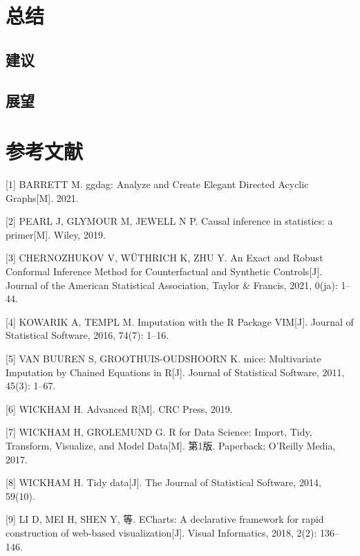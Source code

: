 \documentclass[]{ctexart}
\begin{document}
\hypertarget{ux603bux7ed3}{%
\section{总结}\label{ux603bux7ed3}}

\hypertarget{ux5efaux8bae}{%
\subsection{建议}\label{ux5efaux8bae}}

\hypertarget{ux5c55ux671b}{%
\subsection{展望}\label{ux5c55ux671b}}

\hypertarget{ux53c2ux8003ux6587ux732e}{%
\section*{参考文献}\label{ux53c2ux8003ux6587ux732e}}

\hypertarget{refs}{}
\leavevmode\hypertarget{ref-citation_ggdag}{}%
{[}1{]} BARRETT M. ggdag: Analyze and Create Elegant Directed Acyclic
Graphs{[}M{]}. 2021.

\leavevmode\hypertarget{ref-pearl}{}%
{[}2{]} PEARL J, GLYMOUR M, JEWELL N P. Causal inference in statistics:
a primer{[}M{]}. Wiley, 2019.

\leavevmode\hypertarget{ref-doi:10.1080ux2f01621459.2021.1920957}{}%
{[}3{]} CHERNOZHUKOV V, WÜTHRICH K, ZHU Y. An Exact and Robust Conformal
Inference Method for Counterfactual and Synthetic Controls{[}J{]}.
Journal of the American Statistical Association, Taylor \& Francis,
2021, 0(ja): 1--44.

\leavevmode\hypertarget{ref-citation_VIM}{}%
{[}4{]} KOWARIK A, TEMPL M. Imputation with the R Package VIM{[}J{]}.
Journal of Statistical Software, 2016, 74(7): 1--16.

\leavevmode\hypertarget{ref-citation_mice}{}%
{[}5{]} VAN BUUREN S, GROOTHUIS-OUDSHOORN K. mice: Multivariate
Imputation by Chained Equations in R{[}J{]}. Journal of Statistical
Software, 2011, 45(3): 1--67.

\leavevmode\hypertarget{ref-wickham_2019}{}%
{[}6{]} WICKHAM H. Advanced R{[}M{]}. CRC Press, 2019.

\leavevmode\hypertarget{ref-Wickham2017R}{}%
{[}7{]} WICKHAM H, GROLEMUND G. R for Data Science: Import, Tidy,
Transform, Visualize, and Model Data{[}M{]}. 第1版. Paperback; O'Reilly
Media, 2017.

\leavevmode\hypertarget{ref-tidy-data}{}%
{[}8{]} WICKHAM H. Tidy data{[}J{]}. The Journal of Statistical
Software, 2014, 59(10).

\leavevmode\hypertarget{ref-LI2018136}{}%
{[}9{]} LI D, MEI H, SHEN Y, 等. ECharts: A declarative framework for
rapid construction of web-based visualization{[}J{]}. Visual
Informatics, 2018, 2(2): 136--146.
\end{document}
